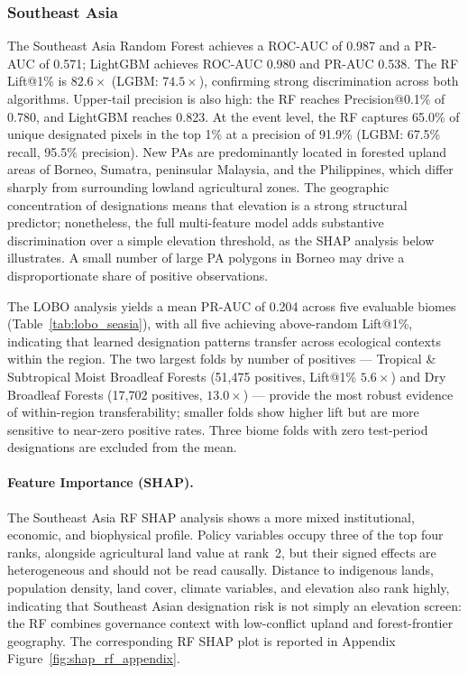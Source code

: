 \documentclass[12pt]{article}
\theoremstyle{break}
\begin{document}
\subsubsection{Southeast Asia}
\label{sec:results_seasia}

The Southeast Asia Random Forest achieves a ROC-AUC of 0.987 and a PR-AUC of 0.571;
LightGBM achieves ROC-AUC 0.980 and PR-AUC 0.538. The RF Lift@1\% is $82.6\times$
(LGBM: $74.5\times$), confirming strong discrimination across both algorithms.
Upper-tail precision is also high: the RF reaches Precision@0.1\% of 0.780, and
LightGBM reaches 0.823. At the event level, the RF captures 65.0\% of unique
designated pixels in the top 1\% at a precision of 91.9\% (LGBM: 67.5\% recall,
95.5\% precision). New PAs are
predominantly located in forested upland areas of Borneo, Sumatra, peninsular
Malaysia, and the Philippines, which differ sharply from surrounding lowland
agricultural zones. The geographic concentration of designations means that elevation
is a strong structural predictor; nonetheless, the full multi-feature model adds
substantive discrimination over a simple elevation threshold, as the SHAP analysis
below illustrates. A small number of large PA polygons in Borneo may drive a
disproportionate share of positive observations.

The LOBO analysis yields a mean PR-AUC of 0.204 across five evaluable biomes
(Table~\ref{tab:lobo_seasia}), with all five achieving above-random Lift@1\%,
indicating that learned designation patterns transfer across ecological contexts within
the region. The two largest folds by number of positives --- Tropical \& Subtropical
Moist Broadleaf Forests (51,475 positives, Lift@1\% $5.6\times$) and Dry Broadleaf
Forests (17,702 positives, $13.0\times$) --- provide the most robust evidence of
within-region transferability; smaller folds show higher lift but are more sensitive
to near-zero positive rates. Three biome folds with zero test-period designations are
excluded from the mean.

\paragraph{Feature Importance (SHAP).}
The Southeast Asia RF SHAP analysis shows a more mixed institutional, economic, and
biophysical profile. Policy variables occupy three of the top four ranks, alongside
agricultural land value at rank~2, but their signed effects are heterogeneous and
should not be read causally. Distance to indigenous lands, population density, land
cover, climate variables, and elevation also rank highly, indicating that Southeast
Asian designation risk is not simply an elevation screen: the RF combines governance
context with low-conflict upland and forest-frontier geography.
The corresponding RF SHAP plot is reported in Appendix Figure~\ref{fig:shap_rf_appendix}.
\end{document}
